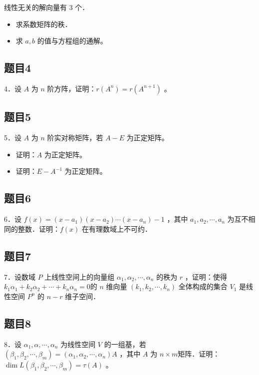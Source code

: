 \documentclass{article}
\begin{document}
线性无关的解向量有 3 个．

\begin{itemize}
  \item[（1）] 求系数矩阵的秩．
  \item[（2）] 求 \(a, b\) 的值与方程组的通解。
\end{itemize}

\subsection{题目4}
4．设 \(A\) 为 \(n\) 阶方阵，证明：\(r\left(A^{n}\right)=r\left(A^{n+1}\right)\) 。

\subsection{题目5}
5．设 \(A\) 为 \(n\) 阶实对称矩阵，若 \(A-E\) 为正定矩阵。

\begin{itemize}
  \item[（1）] 证明：\(A\) 为正定矩阵。
  \item[（2）] 证明：\(E-A^{-1}\) 为正定矩阵。
\end{itemize}

\subsection{题目6}
6．设 \(f(x)=\left(x-a_{1}\right)\left(x-a_{2}\right) \cdots\left(x-a_{n}\right)-1\) ，其中 \(a_{1}, a_{2}, \cdots, a_{n}\) 为互不相同的整数．证明：\(f(x)\) 在有理数域上不可约．

\subsection{题目7}
7．设数域 \(P\) 上线性空间上的向量组 \(\alpha_{1}, \alpha_{2}, \cdots, \alpha_{n}\) 的秩为 \(r\) ，证明：使得 \(k_{1} \alpha_{1}+k_{2} \alpha_{2}+\cdots+k_{n} \alpha_{n}=0\)的 \(n\) 维向量 \(\left(k_{1}, k_{2}, \cdots, k_{n}\right)\) 全体构成的集合 \(V_{1}\) 是线性空间 \(P^{n}\) 的 \(n-r\) 维子空间．

\subsection{题目8}
8．设 \(\alpha_{1}, \alpha, \cdots, \alpha_{n}\) 为线性空间 \(V\) 的一组基，若 \(\left(\beta_{1}, \beta_{2}, \cdots, \beta_{m}\right)=\left(\alpha_{1}, \alpha_{2}, \cdots, \alpha_{n}\right) A\) ，其中 \(A\) 为 \(n \times m\)矩阵．证明： \(\operatorname{dim} L\left(\beta_{1}, \beta_{2}, \cdots, \beta_{m}\right)=\tau(A)\) 。
\end{document}
